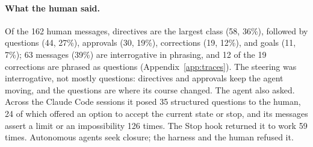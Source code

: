 \paragraph{What the human said.} Of the 162 human messages, directives are the largest class (58,
36\%), followed by questions (44, 27\%), approvals (30, 19\%), corrections (19, 12\%), and goals
(11, 7\%); 63 messages (39\%) are interrogative in phrasing, and 12 of the 19 corrections are
phrased as questions (Appendix~\ref{app:traces}). The steering was interrogative, not mostly questions:
directives and approvals keep the agent moving, and the questions are where its course changed. The
agent also asked. Across the Claude Code sessions it
posed 35 structured questions to the human, 24 of which offered an option to accept the current
state or stop, and its messages assert a limit or an impossibility 126 times. The Stop hook returned
it to work 59 times. Autonomous agents seek closure; the harness and the human refused it.

